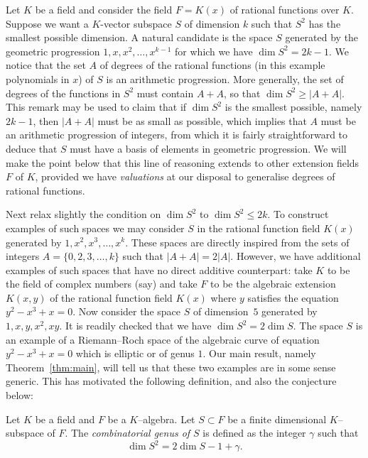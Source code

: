 \documentclass[ALCO,Unicode,ThmDefs]{cedram}
\renewcommand{\geq}{\geqslant}
\renewcommand{\leq}{\leqslant}
\begin{document}
Let $K$ be a field and consider the field $F=K(x)$ of rational functions over $K$. Suppose we want a $K$-vector subspace $S$ of dimension $k$ such that $S^2$ has the smallest possible dimension. A natural candidate is the space $S$ generated by the geometric progression $1,x,x^2,\ldots,x^{k-1}$ for which we have $\dim S^2=2k-1$. We notice that the set $A$ of degrees of the rational functions (in this example polynomials in $x$) of $S$ is an arithmetic progression. More generally, the set of degrees of the functions in $S^2$ must contain $A+A$, so that $\dim S^2\geq|A+A|$. This remark may be used to claim that if $\dim S^2$ is the smallest possible, namely $2k-1$, then $|A+A|$ must be as small as possible, which implies that $A$ must be an arithmetic progression of integers, from which it is fairly straightforward to deduce that $S$ must have a basis of elements in geometric progression. We will make the point below that this line of reasoning extends to other extension fields $F$ of $K$, provided we have \emph{valuations} at our disposal to generalise degrees of rational functions.

Next relax slightly the condition on $\dim S^2$ to $\dim S^2\leq2k$. To construct examples of such spaces we may consider $S$ in the rational function field $K(x)$ generated by $1,x^2,x^3,\ldots,x^k$. These spaces are directly inspired from the sets of integers $A=\{0,2,3,\ldots,k\}$ such that $|A+A|=2|A|$. However, we have additional examples of such spaces that have no direct additive counterpart: take $K$ to be the field of complex numbers (say) and take $F$ to be the algebraic extension $K(x,y)$ of the rational function field $K(x)$ where $y$ satisfies the equation $y^2-x^3+x=0$. Now consider the space $S$ of dimension~$5$ generated by $1,x,y,x^2,xy$. It is readily checked that we have $\dim S^2=2\dim S$. The space $S$ is an example of a Riemann--Roch space of the algebraic curve of equation $y^2-x^3+x=0$ which is elliptic or of genus $1$. Our main result, namely Theorem~\ref{thm:main}, will tell us that these two examples are in some sense generic. This has motivated the following definition, and also the conjecture below:

\begin{defi}\label{def:gamma}
Let $K$ be a field and $F$ be a $K$--algebra. Let $S \subset F$ be a finite dimensional $K$--subspace of $F$. The \emph{combinatorial genus of $S$} is defined as the integer $\gamma$ such that
\[
\dim S^2=2\dim S - 1 + \gamma.
\]
\end{defi}
\end{document}
